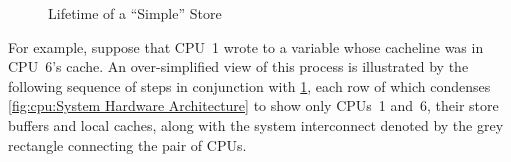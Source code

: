 \begin{figure}
\centering
{}
\caption{Lifetime of a ``Simple'' Store}
\label{fig:cpu:Lifetime of a Simple Store}
\end{figure}

For example, suppose that CPU~1 wrote to a variable  whose cacheline
was in CPU~6's cache.
An over-simplified view of this process is illustrated by the following
sequence of steps in conjunction with
\cref{fig:cpu:Lifetime of a Simple Store},
each row of which condenses
\cref{fig:cpu:System Hardware Architecture}
to show only CPUs~1 and~6, their store buffers and local caches, along
with the system interconnect denoted by the grey rectangle connecting
the pair of CPUs.

